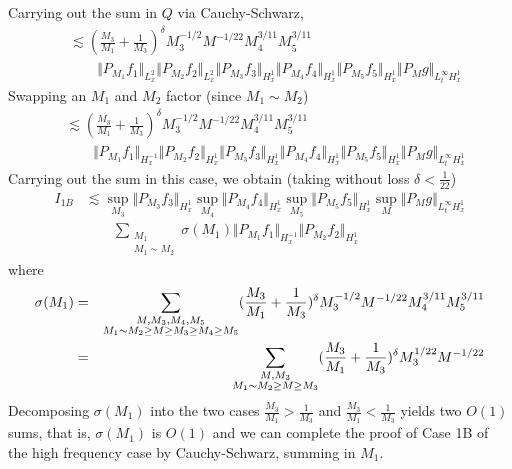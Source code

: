 \documentclass[12pt,letterpaper,leqno]{amsart}
\theoremstyle{plain}
\numberwithin{equation}{section}
\numberwithin{theorem}{section}
\numberwithin{proposition}{section}
\numberwithin{lemma}{section}
\numberwithin{corollary}{section}
\begin{document}
Carrying out the sum in $Q$ via Cauchy-Schwarz, 
\begin{align*}
& \lesssim (\frac{M_{3}}{M_{1}}+\frac{1}{M_{3}})^{\delta
}M_{3}^{-1/2}M^{-1/22}M_{4}^{3/11}M_{5}^{3/11} \\
& \qquad \Vert P_{M_{1}}f_{1}\Vert _{L_{x}^{2}}\Vert P_{M_{2}}f_{2}\Vert
_{L_{x}^{2}}\Vert P_{M_{3}}f_{3}\Vert _{H_{x}^{1}}\Vert P_{M_{4}}f_{4}\Vert
_{H_{x}^{1}}\Vert P_{M_{5}}f_{5}\Vert _{H_{x}^{1}}\Vert P_{M}g\Vert
_{L_{t}^{\infty }H_{x}^{1}}
\end{align*}%
Swapping an $M_{1}$ and $M_{2}$ factor (since $M_{1}\sim M_{2}$) 
\begin{align*}
& \lesssim (\frac{M_{3}}{M_{1}}+\frac{1}{M_{3}})^{\delta
}M_{3}^{-1/2}M^{-1/22}M_{4}^{3/11}M_{5}^{3/11} \\
& \qquad \Vert P_{M_{1}}f_{1}\Vert _{H_{x}^{-1}}\Vert P_{M_{2}}f_{2}\Vert
_{H_{x}^{1}}\Vert P_{M_{3}}f_{3}\Vert _{H_{x}^{1}}\Vert P_{M_{4}}f_{4}\Vert
_{H_{x}^{1}}\Vert P_{M_{5}}f_{5}\Vert _{H_{x}^{1}}\Vert P_{M}g\Vert
_{L_{t}^{\infty }H_{x}^{1}}
\end{align*}%
Carrying out the sum in this case, we obtain (taking without loss $\delta <%
\frac{1}{22}$) 
\begin{align*}
I_{1B}& \lesssim \sup_{M_{3}}\Vert P_{M_{3}}f_{3}\Vert
_{H_{x}^{1}}\sup_{M_{4}}\Vert P_{M_{4}}f_{4}\Vert
_{H_{x}^{1}}\sup_{M_{5}}\Vert P_{M_{5}}f_{5}\Vert _{H_{x}^{1}}\sup_{M}\Vert
P_{M}g\Vert _{L_{t}^{\infty }H_{x}^{1}} \\
& \qquad \sum_{\substack{ M_{1}  \\ M_{1}\sim M_{2}}}\sigma (M_{1})\Vert
P_{M_{1}}f_{1}\Vert _{H_{x}^{-1}}\Vert P_{M_{2}}f_{2}\Vert _{H_{x}^{1}}
\end{align*}%
where%
\begin{eqnarray*}
\sigma (M_{1}) &=&\sum_{\substack{ M,M_{3},M_{4},M_{5}  \\ M_{1}\sim
M_{2}\geq M\geq M_{3}\geq M_{4}\geq M_{5}}}(\frac{M_{3}}{M_{1}}+\frac{1}{%
M_{3}})^{\delta }M_{3}^{-1/2}M^{-1/22}M_{4}^{3/11}M_{5}^{3/11} \\
&=&\sum_{\substack{ M,M_{3}  \\ M_{1}\sim M_{2}\geq M\geq M_{3}}}(\frac{M_{3}%
}{M_{1}}+\frac{1}{M_{3}})^{\delta }M_{3}^{1/22}M^{-1/22}
\end{eqnarray*}%
Decomposing $\sigma (M_{1})$ into the two cases $\frac{M_{3}}{M_{1}}>\frac{1%
}{M_{3}}$ and $\frac{M_{3}}{M_{1}}<\frac{1}{M_{3}}$ yields two $O(1)$ sums,
that is, $\sigma (M_{1})$ is $O(1)$ and we can complete the proof of Case 1B
of the high frequency case by Cauchy-Schwarz, summing in $M_{1}$.
\end{document}
